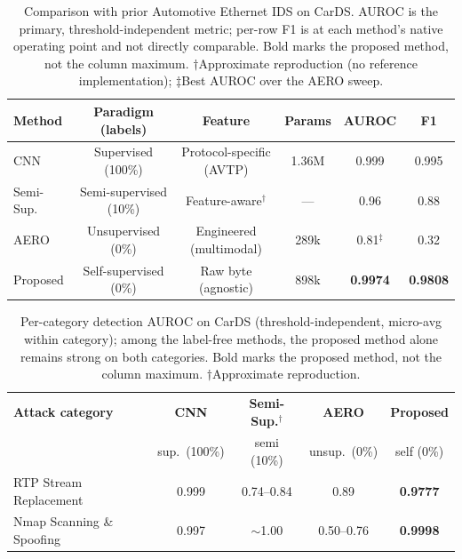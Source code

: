 \begin{table}[!tbp]
\centering
\caption{Comparison with prior Automotive Ethernet IDS on CarDS. AUROC is the primary, threshold-independent metric; per-row F1 is at each method's native operating point and not directly comparable. Bold marks the proposed method, not the column maximum. $\dagger$Approximate reproduction (no reference implementation); $\ddagger$Best AUROC over the AERO sweep.}
\label{tab:baseline}
\footnotesize
\begin{tabular}{lccccc}
\toprule
\textbf{Method} & \textbf{Paradigm (labels)} & \textbf{Feature} & \textbf{Params} & \textbf{AUROC} & \textbf{F1} \\
\midrule
CNN~\cite{jeong2021convolutional}   & Supervised (100\%)     & Protocol-specific (AVTP) & 1.36M & 0.999           & 0.995 \\
Semi-Sup.~\cite{shibly2023feature}  & Semi-supervised (10\%) & Feature-aware$^\dagger$  &---   & 0.96            & 0.88  \\
AERO~\cite{jeong2023aero}           & Unsupervised (0\%)     & Engineered (multimodal)  & 289k  & 0.81$^\ddagger$ & 0.32  \\
\midrule
Proposed                            & Self-supervised (0\%)  & Raw byte (agnostic)      & 898k  & \textbf{0.9974} & \textbf{0.9808} \\
\bottomrule
\end{tabular}
\end{table}

\begin{table}[!tbp]
\centering
\caption{Per-category detection AUROC on CarDS (threshold-independent, micro-avg within category); among the label-free methods, the proposed method alone remains strong on both categories. Bold marks the proposed method, not the column maximum. $\dagger$Approximate reproduction.}
\label{tab:baseline_perattack}
\footnotesize
\begin{tabular}{lcccc}
\toprule
\textbf{Attack category} & \textbf{CNN} & \textbf{Semi-Sup.$^\dagger$} & \textbf{AERO} & \textbf{Proposed} \\
                         & {\footnotesize sup.\ (100\%)} & {\footnotesize semi (10\%)} & {\footnotesize unsup.\ (0\%)} & {\footnotesize self (0\%)} \\
\midrule
RTP Stream Replacement    & 0.999 & 0.74--0.84 & 0.89       & \textbf{0.9777} \\
Nmap Scanning \& Spoofing & 0.997 & $\sim$1.00 & 0.50--0.76 & \textbf{0.9998} \\
\bottomrule
\end{tabular}
\end{table}


